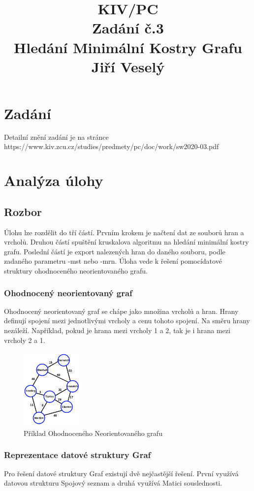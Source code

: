 \documentclass[12pt, a4paper]{report}
\title{KIV/PC\\Zadání č.3\\Hledání Minimální Kostry Grafu\\Jiří Veselý}
\begin{document}
\maketitle
\tableofcontents

%
%
\chapter{Zadání}
Detailní znění zadání je na stránce\\ https://www.kiv.zcu.cz/studies/predmety/pc/doc/work/sw2020-03.pdf
%
%
\chapter{Analýza úlohy}
\section{Rozbor}
Úlohu lze rozdělit do tří částí. Prvním krokem je načtení dat ze souborů hran a vrcholů. Druhou částí spuštění kruskalova algoritmu na hledání minimální kostry grafu. Poslední částí je export nalezených hran do daného souboru, podle zadaného parametru -mst nebo -mrn. Úloha vede k řešení pomocídatové struktury ohodnoceného neorientovaného grafu.
%
%
\subsection{Ohodnocený neorientovaný graf}
Ohodnocený neorientovaný graf se chápe jako množina vrcholů a hran. Hrany definují spojení mezi jednotlivými vrcholy a cenu tohoto spojení. Na směru hrany nezáleží. Například, pokud je hrana mezi vrcholy 1 a 2, tak je i hrana mezi vrcholy 2 a 1.
\begin{figure}[h!]
\centering
\includegraphics[width=3cm, height=4cm]{graph_example}
\caption{Příklad Ohodnoceného Neorientovaného grafu}
\end{figure}
%
%
\newpage
\subsection{Reprezentace datové struktury Graf}
Pro řešení datové struktury Graf existují dvě nejčastější řešení. První využívá datovou strukturu Spojový seznam a druhá využívá Matici souslednosti.
%
%
\end{document}

